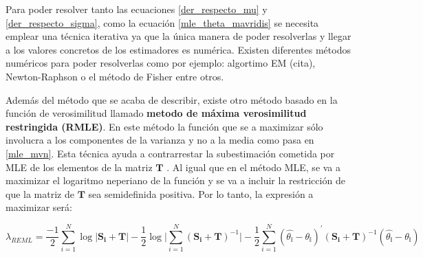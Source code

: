 \documentclass[a4paper,openright,12pt]{report}
\begin{document}
Para poder resolver tanto las ecuaciones \ref{der_respecto_mu} y \ref{der_respecto_sigma}, como la ecuación \ref{mle_theta_mavridis} se necesita emplear una técnica iterativa ya que la única manera de poder resolverlas y llegar a los valores concretos de los estimadores es numérica. Existen diferentes métodos numéricos para poder resolverlas como por ejemplo: algortimo EM (cita), Newton-Raphson o el método de Fisher entre otros.

Además del método que se acaba de describir, existe otro método basado en la función de verosimilitud llamado \textbf{metodo de máxima verosimilitud restringida (RMLE)}. En este método la función que se a maximizar sólo involucra a los componentes de la varianza y no a la media como pasa en \ref{mle_mvn}. Esta técnica ayuda a contrarrestar la subestimación cometida por MLE de los elementos de la matriz $\mathbf{T}$ \cite{Jackson2011}. Al igual que en el método MLE, se va a maximizar el logaritmo neperiano de la función y se va a incluir la restricción de que la matriz de $\mathbf{T}$ sea semidefinida positiva. Por lo tanto, la expresión a maximizar será:

{\footnotesize \begin{equation}
\lambda_{REML}=\frac{-1}{2}\sum_{i=1}^{N}\log\vert\mathbf{S_{i}+T}\vert-\frac{1}{2}\log\vert\sum_{i=1}^{N}(\mathbf{S_{i}+T})^{-1}\vert-\frac{1}{2}\sum_{i=1}^{N}(\mathbb{\widehat{\theta_{i}}}-\mathbb{\theta_{i}})^{'}(\mathbf{S_{i}+T})^{-1}(\mathbb{\widehat{\theta_{i}}}-\mathbb{\theta_{i}})
\label{rmle_mvm}
\end{equation}}
\end{document}
